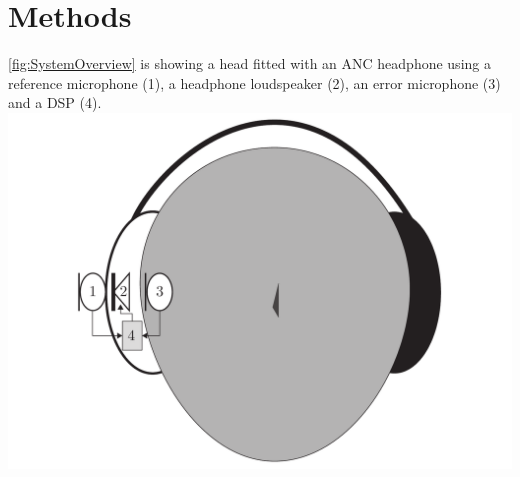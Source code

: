 \section{Methods}
\autoref{fig:SystemOverview} is showing a head fitted with an ANC headphone using a reference microphone (1), a headphone loudspeaker (2), an error microphone (3) and a DSP (4).
{
	\includegraphics[width=1\columnwidth]{figures/ArticleIllustrations/SystemOverview}
	\label{fig:SystemOverview}
}





